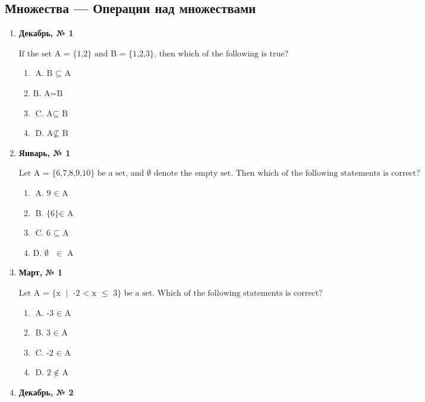 \subsection*{Множества — Операции над множествами}
\begin{enumerate}
\item \textbf{Декабрь, № 1} \par \smallskip
$\displaystyle \text{If the set A = }\{\text{1,2}\}\text{ and B = }\{\text{1,2,3}\}\text{, then which of the following is true?}$
\begin{enumerate}
\item $\displaystyle \text{A. B }\subseteq\text{ A}$
\item $\displaystyle \text{B. A=B}$
\item $\displaystyle \text{C. A}\subseteq\text{ B}$
\item $\displaystyle \text{D. A}\nsubseteq\text{ B}$
\end{enumerate}
\item \textbf{Январь, № 1} \par \smallskip
$\displaystyle \text{Let A = }\{\text{6,7,8,9,10}\}\text{ be a set, and }\emptyset\text{  denote the empty set. Then which of the following statements is correct?}$
\begin{enumerate}
\item $\displaystyle \text{A. 9 }\in\text{  A}$
\item $\displaystyle \text{B. \{6\} }\in\text{  A}$
\item $\displaystyle \text{C. 6 }\subseteq\text{  A}$
\item $\displaystyle \text{D. }\emptyset\text{ }\in\text{  A}$
\end{enumerate}
\item \textbf{Март, № 1} \par \smallskip
$\displaystyle \text{Let A = }\{\text{x }\mid\text{ -2 < x }\leq\text{  3}\}\text{ be a set. Which of the following statements is correct?}$
\begin{enumerate}
\item $\displaystyle \text{A. -3 }\in\text{  A}$
\item $\displaystyle \text{B. 3 }\in\text{  A}$
\item $\displaystyle \text{C. -2 }\in\text{  A}$
\item $\displaystyle \text{D. 2 }\notin\text{  A}$
\end{enumerate}
\item \textbf{Декабрь, № 2} \par \smallskip

\end{enumerate}
